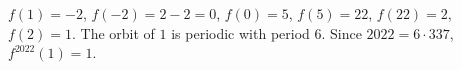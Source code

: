 $f(1)=-2$, $f(-2)=2-2=0$, $f(0)=5$, $f(5)=22$, $f(22)=2$, $f(2)=1$. The orbit of $1$ is periodic with period $6$. Since $2022=6\cdot337$, $f^{2022}(1)=\boxed{1}$.
